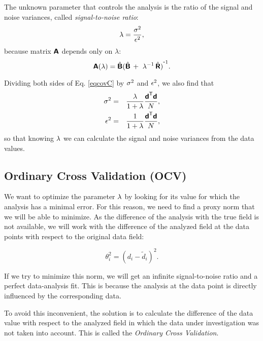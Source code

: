 The unknown parameter that controls the analysis is the ratio of the signal and noise variances, called \textit{signal-to-noise ratio}:
\begin{equation}
\lambda=\frac{\sigma^2}{\epsilon^2},
\end{equation}
because matrix $\mbox{\boldmath $ \protect\mathsf{A} $}$ depends only on $\lambda$:
\begin{equation}
\mbox{\boldmath $ \protect\mathsf{A} $}(\lambda)=\hat{\mbox{\boldmath $ \protect\mathsf{B} $}} {(\hat{\mbox{\boldmath $ \protect\mathsf{B} $}}\, + \,\, \lambda^{-1} \, \hat{\mbox{\boldmath $ \protect\mathsf{R} $}})}^{ \mbox{\small{-}} 1}.
\end{equation}


Dividing both sides of Eq. \ref{eqcovC} by $\sigma^{2}$ and  $\epsilon^{2}$, we also find that
\begin{eqnarray}
\sigma^2 &=& \frac{\lambda}{1 + \lambda} \frac{ {\mbox{\boldmath $ \protect\mathsf{d} $}}^\mathsf{T} \mbox{\boldmath $ \protect\mathsf{d} $}}{N},\label{eq:signalsnr}\\
\epsilon^2 &=& \frac{1 }{ 1 + \lambda} \frac{ {\mbox{\boldmath $ \protect\mathsf{d} $}}^\mathsf{T} \mbox{\boldmath $ \protect\mathsf{d} $} }{ N},\label{eq:noisesnr}
\end{eqnarray}
so that knowing $\lambda$ we can calculate the signal and noise variances from the data values.


\subsection{Ordinary Cross Validation (OCV)}

We want to optimize the parameter $\lambda$ by looking for its value for which the analysis has a minimal error. For this reason, we need to find a proxy norm that we will be able to minimize. As the difference of the analysis with the true field is not available, we will work with the difference of the analyzed field at the data points with respect to the original data field:

\begin{equation}
{\theta_i^2} = {(d_i - \tilde{d}_i)^2}.
\end{equation}

If we try to minimize this norm, we will get an infinite signal-to-noise ratio and a perfect data-analysis fit. This is because the analysis at the data point is directly influenced by the corresponding data. 

To avoid this inconvenient, the solution is to calculate the difference of the data value with respect to the analyzed field in which the data under investigation was not taken into account. This is called the \textit{Ordinary Cross Validation}. 

